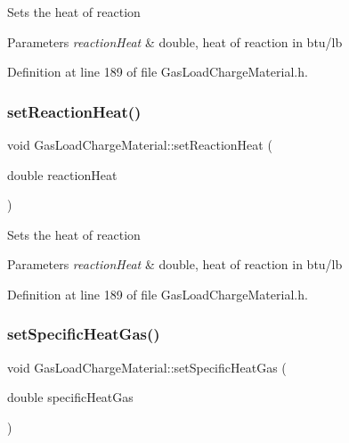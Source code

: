 Sets the heat of reaction 
\begin{DoxyParams}{Parameters}
{\em reaction\+Heat} & double, heat of reaction in btu/lb \\
\hline
\end{DoxyParams}


Definition at line 189 of file Gas\+Load\+Charge\+Material.\+h.

\mbox{\label{class_gas_load_charge_material_a721f02cbd0bfbb6ebe67c0da09f0b0f2}} 
\subsubsection{\texorpdfstring{set\+Reaction\+Heat()}{setReactionHeat()}\hspace{0.1cm}{\footnotesize\ttfamily [3/3]}}
{\footnotesize\ttfamily void Gas\+Load\+Charge\+Material\+::set\+Reaction\+Heat (\begin{DoxyParamCaption}\item[{double}]{reaction\+Heat }\end{DoxyParamCaption})\hspace{0.3cm}{\ttfamily [inline]}}

Sets the heat of reaction 
\begin{DoxyParams}{Parameters}
{\em reaction\+Heat} & double, heat of reaction in btu/lb \\
\hline
\end{DoxyParams}


Definition at line 189 of file Gas\+Load\+Charge\+Material.\+h.

\mbox{\label{class_gas_load_charge_material_a07bf6d4ee9161683fbeb3baad16ea7be}} 
\subsubsection{\texorpdfstring{set\+Specific\+Heat\+Gas()}{setSpecificHeatGas()}\hspace{0.1cm}{\footnotesize\ttfamily [1/3]}}
{\footnotesize\ttfamily void Gas\+Load\+Charge\+Material\+::set\+Specific\+Heat\+Gas (\begin{DoxyParamCaption}\item[{double}]{specific\+Heat\+Gas }\end{DoxyParamCaption})\hspace{0.3cm}{\ttfamily [inline]}}

